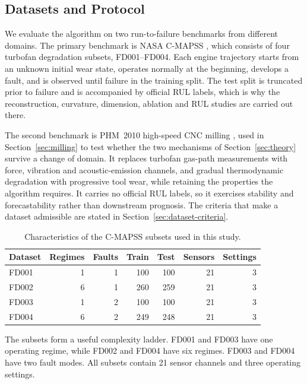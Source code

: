 \documentclass[a4paper,fleqn]{cas-sc}
\newcommand{\tablefont}{\small}
\newcommand{\tighttables}{%
  \setlength{\tabcolsep}{4.5pt}%
  \renewcommand{\arraystretch}{1.08}%
}
\begin{document}
\subsection{Datasets and Protocol}

We evaluate the algorithm on two run-to-failure benchmarks from different
domains. The primary benchmark is NASA C-MAPSS
\citep{nasa_cmapss,saxena2008turbofan,saxena2008damage}, which consists of four
turbofan degradation subsets, FD001--FD004. Each engine trajectory starts from
an unknown initial wear state, operates normally at the beginning, develops a
fault, and is observed until failure in the training split. The test split is
truncated prior to failure and is accompanied by official RUL labels, which is
why the reconstruction, curvature, dimension, ablation and RUL studies are
carried out there.

The second benchmark is PHM~2010 high-speed CNC milling \citep{phm2010}, used in
Section~\ref{sec:milling} to test whether the two mechanisms of
Section~\ref{sec:theory} survive a change of domain. It replaces turbofan gas-path
measurements with force, vibration and acoustic-emission channels, and gradual
thermodynamic degradation with progressive tool wear, while retaining the
properties the algorithm requires. It carries no official RUL labels, so it
exercises stability and forecastability rather than downstream prognosis. The
criteria that make a dataset admissible are stated in
Section~\ref{sec:dataset-criteria}.

\begin{table}[t]
\centering
\caption{Characteristics of the C-MAPSS subsets used in this study.}
\label{tab:dataset_protocol}
\tablefont
\tighttables
\begin{tabular}{@{}lrrrrrr@{}}
\toprule
Dataset & Regimes & Faults & Train & Test & Sensors & Settings \\
\midrule
FD001 & 1 & 1 & 100 & 100 & 21 & 3 \\
FD002 & 6 & 1 & 260 & 259 & 21 & 3 \\
FD003 & 1 & 2 & 100 & 100 & 21 & 3 \\
FD004 & 6 & 2 & 249 & 248 & 21 & 3 \\
\bottomrule
\end{tabular}
\end{table}

The subsets form a useful complexity ladder. FD001 and FD003 have one
operating regime, while FD002 and FD004 have six regimes. FD003 and FD004 have
two fault modes. All subsets contain 21 sensor channels and three operating
settings.
\end{document}
